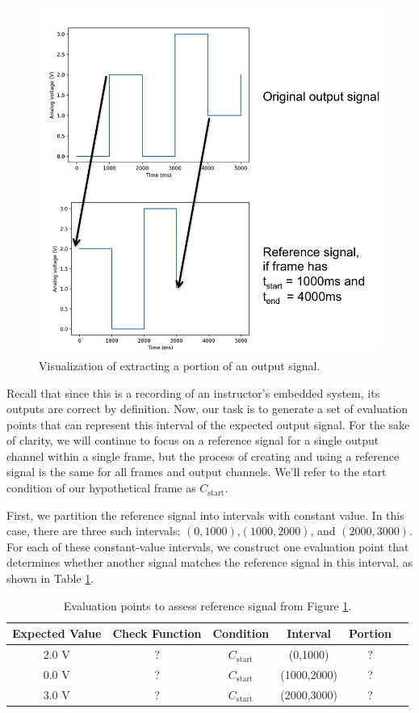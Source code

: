 \documentclass[12pt]{article}
\begin{document}
\begin{figure}[ht]
\centering
\includegraphics[width=0.6\linewidth]{output-framing.png}
\caption{Visualization of extracting a portion of an output signal.}
\label{fig:output-framing}
\end{figure}

Recall that since this is a recording of an instructor's embedded system, its outputs are correct by definition.  Now, our task is to generate a set of evaluation points that can represent this interval of the expected output signal.  For the sake of clarity, we will continue to focus on a reference signal for a single output channel within a single frame, but the process of creating and using a reference signal is the same for all frames and output channels.  We'll refer to the start condition of our hypothetical frame as $C_{\text{start}}$.

First, we partition the reference signal into intervals with constant value.  In this case, there are three such intervals: $(0,1000)$,$(1000,2000)$, and $(2000,3000)$.  For each of these constant-value intervals, we construct one evaluation point that determines whether another signal matches the reference signal in this interval, as shown in Table \ref{table:construct-points}.

\begin{table}[ht]
\begin{center}
\caption{Evaluation points to assess reference signal from Figure \ref{fig:output-framing}.}
\vspace{2mm}
\label{table:construct-points}
\begin{tabular}{cccccc}
Expected Value & Check Function & Condition & Interval & Portion \\ \hline
2.0 V & ? & $C_{\text{start}}$ & (0,1000) & ? \\
0.0 V & ? & $C_{\text{start}}$ & (1000,2000) & ? \\
3.0 V & ? & $C_{\text{start}}$ & (2000,3000) & ? \\ \hline
\end{tabular}
\end{center}
\end{table}
\end{document}

